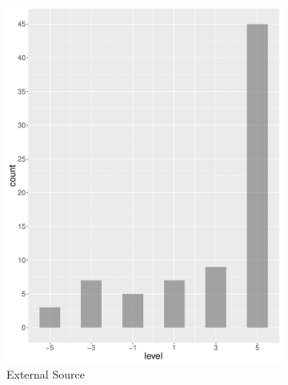 \begin{figure}
\begin{subfigure}[b]{0.4\textwidth}
        \includegraphics[width=\textwidth]{plots/finance/hist_level_es}
        \caption{External Source}
        \label{fig:hist_level_finance_es}
    \end{subfigure}
    ~
    \begin{subfigure}[b]{0.4\textwidth}

\end{subfigure}
\end{figure}

